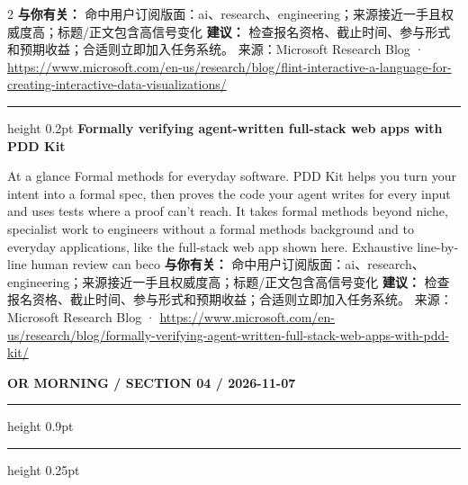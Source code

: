 \documentclass[10.5pt]{ctexart}
\begin{document}
\begin{multicols}{2}
\textbf{与你有关：} 命中用户订阅版面：ai、research、engineering；来源接近一手且权威度高；标题/正文包含高信号变化
\textbf{建议：} 检查报名资格、截止时间、参与形式和预期收益；合适则立即加入任务系统。
{\footnotesize\color{ormuted} 来源：Microsoft Research Blog · \url{https://www.microsoft.com/en-us/research/blog/flint-interactive-a-language-for-creating-interactive-data-visualizations/}}
\vspace{2mm}
\hrule height 0.2pt
\vspace{2mm}
{\large\bfseries Formally verifying agent-written full-stack web apps with PDD Kit}\par
At a glance Formal methods for everyday software. PDD Kit helps you turn your intent into a formal spec, then proves the code your agent writes for every input and uses tests where a proof can’t reach. It takes formal methods beyond niche, specialist work to engineers without a formal methods background and to everyday applications, like the full-stack web app shown here. Exhaustive line-by-line human review can beco
\textbf{与你有关：} 命中用户订阅版面：ai、research、engineering；来源接近一手且权威度高；标题/正文包含高信号变化
\textbf{建议：} 检查报名资格、截止时间、参与形式和预期收益；合适则立即加入任务系统。
{\footnotesize\color{ormuted} 来源：Microsoft Research Blog · \url{https://www.microsoft.com/en-us/research/blog/formally-verifying-agent-written-full-stack-web-apps-with-pdd-kit/}}
\end{multicols}
\newpage
{\small\bfseries OR MORNING / SECTION 04 / 2026-11-07}
\vspace{2mm}
\hrule height 0.9pt
\vspace{1.5mm}
\hrule height 0.25pt
\vspace{4mm}
\end{document}
